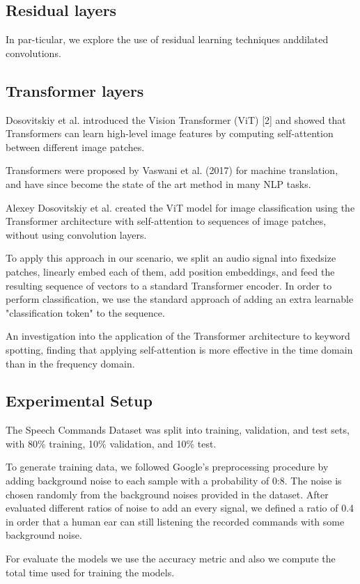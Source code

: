 \subsection{Residual layers}
In par-ticular, we explore the use of residual learning techniques anddilated convolutions.


\subsection{Transformer layers}

Dosovitskiy et al. introduced the Vision Transformer (ViT) [2] and showed that Transformers can learn high-level image features by computing self-attention between different image patches. 	

Transformers were proposed by Vaswani et al. (2017) for machine translation, and have since become the state of the art method in many NLP tasks.
	 	 	 		
Alexey Dosovitskiy et al. created the ViT model for image classification using the Transformer architecture with self-attention to sequences of image patches, without using convolution layers.
	
 To apply this approach in our scenario, we split an audio signal into fixed\-size patches, linearly embed each of them, add position embeddings, and feed the resulting sequence of vectors to a standard Transformer encoder. In order to perform classification, we use the standard approach of adding an extra learnable "classification token" to the sequence.


An investigation into the application of the Transformer architecture to keyword spotting, finding that applying self-attention is more effective in the time domain than in the frequency domain.



\subsection{Experimental Setup}

The Speech Commands Dataset was
split into training, validation, and test sets, with 80\% training,
10\% validation, and 10\% test.

To generate training data, we followed Google’s preprocessing
procedure by adding background noise to each
sample with a probability of 0:8. The noise is chosen randomly from the background noises provided
in the dataset. After evaluated different ratios of noise to add an every signal, we defined a ratio of 0.4 in order that a human ear can still listening the recorded commands with some background noise. 

For evaluate the models we use the accuracy metric and also we compute the total time used for training the models.
